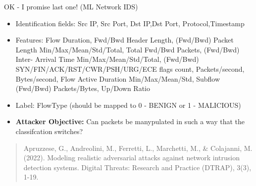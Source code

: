 \documentclass[t,compress,aspectratio=169]{beamer}
\begin{document}
\begin{frame}[fragile]{OK - I promise last one! (ML Network IDS)}
    \begin{itemize}
        \item Identification fields: Src IP, Src Port, Dst IP,Dst Port, Protocol,Timestamp
        \item Features: Flow Duration, Fwd/Bwd Header Length, (Fwd/Bwd) Packet Length Min/Max/Mean/Std/Total, Total Fwd/Bwd Packets, (Fwd/Bwd) Inter- Arrival Time Min/Max/Mean/Std/Total, (Fwd/Bwd) SYN/FIN/ACK/RST/CWR/PSH/URG/ECE flags count, Packets/second, Bytes/second, Flow Active Duration Min/Max/Mean/Std, Subflow (Fwd/Bwd) Packets/Bytes, Up/Down Ratio
        \item Label: FlowType (should be mapped to 0 - BENIGN or 1 - MALICIOUS)
        \item \textbf{\textcolor{aisecred}{Attacker Objective:}} Can packets be manypulated in such a way that the classifcation switches?

    \end{itemize}
    
    \begin{quote}\tiny
Apruzzese, G., Andreolini, M., Ferretti, L., Marchetti, M., \& Colajanni, M. (2022). Modeling realistic adversarial attacks against network intrusion detection systems. Digital Threats: Research and Practice (DTRAP), 3(3), 1-19.
	 \end{quote}
    

		

    
\end{frame}

\end{document}
